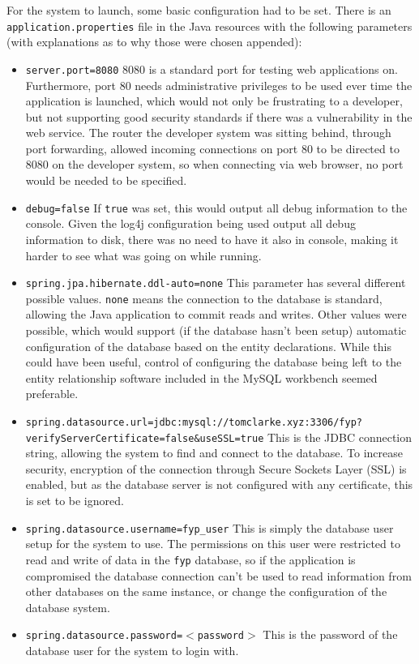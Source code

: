 For the system to launch, some basic configuration had to be set. There is an \texttt{application.properties} file in the Java resources with the following parameters (with explanations as to why those were chosen appended):
\begin{itemize}
	\item \texttt{server.port=8080} 8080 is a standard port for testing web applications on. Furthermore, port 80 needs administrative privileges to be used ever time the application is launched, which would not only be frustrating to a developer, but not supporting good security standards if there was a vulnerability in the web service. The router the developer system was sitting behind, through port forwarding, allowed incoming connections on port 80 to be directed to 8080 on the developer system, so when connecting via web browser, no port would be needed to be specified.
	\item \texttt{debug=false} If \texttt{true} was set, this would output all debug information to the console. Given the log4j configuration being used output all debug information to disk, there was no need to have it also in console, making it harder to see what was going on while running.
	\item \texttt{spring.jpa.hibernate.ddl-auto=none} This parameter has several different possible values. \texttt{none} means the connection to the database is standard, allowing the Java application to commit reads and writes. Other values were possible, which would support (if the database hasn't been setup) automatic configuration of the database based on the entity declarations. While this could have been useful, control of configuring the database being left to the entity relationship software included in the MySQL workbench seemed preferable.
	\item \texttt{spring.datasource.url=\newline jdbc:mysql://tomclarke.xyz:3306/fyp?verifyServerCertificate=false\&useSSL=true} This is the JDBC connection string, allowing the system to find and connect to the database. To increase security, encryption of the connection through Secure Sockets Layer (SSL) is enabled, but as the database server is not configured with any certificate, this is set to be ignored.
	\item \texttt{spring.datasource.username=fyp\_user} This is simply the database user setup for the system to use. The permissions on this user were restricted to read and write of data in the \texttt{fyp} database, so if the application is compromised the database connection can't be used to read information from other databases on the same instance, or change the configuration of the database system. 
	\item \texttt{spring.datasource.password=$<$password$>$} This is the password of the database user for the system to login with.
\end{itemize}

